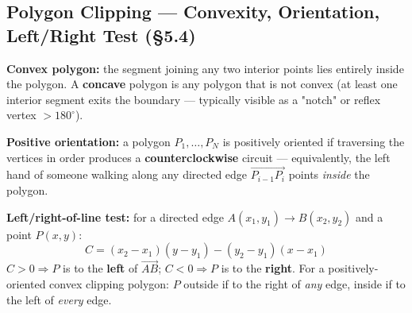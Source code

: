 \documentclass[12pt, a4paper]{article}
\newenvironment{answerbox}{\begin{mdframed}[style=answerframe]}{\end{mdframed}}
\begin{document}
\subsection{Polygon Clipping --- Convexity, Orientation, Left/Right Test (\S5.4)}
\begin{answerbox}
\textbf{Convex polygon:} the segment joining any two interior points lies entirely inside the polygon. A \textbf{concave} polygon is any polygon that is not convex (at least one interior segment exits the boundary --- typically visible as a "notch" or reflex vertex $>180^\circ$).

\textbf{Positive orientation:} a polygon $P_1,\dots,P_N$ is positively oriented if traversing the vertices in order produces a \textbf{counterclockwise} circuit --- equivalently, the left hand of someone walking along any directed edge $\overrightarrow{P_{i-1}P_i}$ points \emph{inside} the polygon.

\textbf{Left/right-of-line test:} for a directed edge $A(x_1,y_1)\to B(x_2,y_2)$ and a point $P(x,y)$:
$$C = (x_2-x_1)(y-y_1) - (y_2-y_1)(x-x_1)$$
$C>0 \Rightarrow P$ is to the \textbf{left} of $\overrightarrow{AB}$; $C<0 \Rightarrow P$ is to the \textbf{right}. For a positively-oriented convex clipping polygon: $P$ outside if to the right of \emph{any} edge, inside if to the left of \emph{every} edge.
\end{answerbox}

\end{document}
